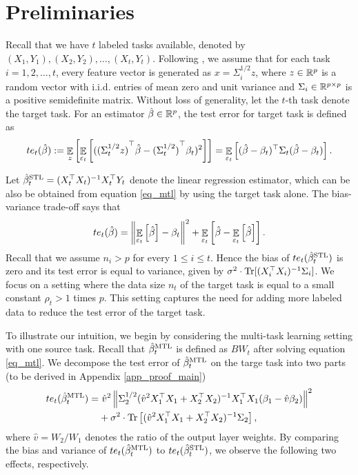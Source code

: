 \section{Preliminaries}\label{sec_setup}

Recall that we have $t$ labeled tasks available, denoted by $(X_1, Y_1), (X_2, Y_2), \dots, (X_t, Y_t)$.
Following \cite{HMRT19,BLLT20}, we assume that for each task $i = 1,2,\dots,t$,  every feature vector is generated as $x = \Sigma_i^{1/2} z$, where $z\in\mathbb{R}^p$ is a random vector with i.i.d. entries of mean zero and unit variance and $\Sigma_i\in\mathbb{R}^{p\times p}$ is a positive semidefinite matrix.
Without loss of generality, let the $t$-th task denote the target task.
For an estimator $\hat{\beta}\in\mathbb{R}^p$, the test error for target task is defined as
	\begin{align*}
		te_t(\hat{\beta}) := \mathop{\mathbb{E}}_{z}\left[ \mathop{\mathbb{E}}_{\varepsilon_t}\left[ ({(\Sigma_t^{1/2} z)}^{\top}\hat{\beta} - {(\Sigma_t^{1/2})}^{\top}\beta_t)^2 \right] \right]
		= \mathop{\mathbb{E}}_{\varepsilon_t}\left[ (\hat{\beta} - \beta_t)^{\top}\Sigma_t(\hat{\beta} - \beta_t) \right].
	\end{align*}

Let $\hat{\beta}_t^{\text{STL}} = (X_t^{\top}X_t)^{-1}X_t^{\top}Y_t$ denote the linear regression estimator, which can be also be obtained from equation \eqref{eq_mtl} by using the target task alone.
The bias-variance trade-off \cite{HTF09} says that
	\[ te_t(\hat{\beta}) =
		\left\| \mathop{\mathbb{E}}_{\varepsilon_t}\left[ \hat{\beta} \right] - \beta_t \right\|^2 + \mathop{\mathbb{E}}_{\varepsilon_t}\left[ \hat{\beta} - \mathop{\mathbb{E}}_{\varepsilon_t}\left[ \hat{\beta} \right] \right]. \]
Recall that we assume $n_i > p$ for every $1\le i\le t$.
Hence the bias of $te_t(\hat{\beta}_t^{\text{STL}})$ is zero and its test error is equal to variance, given by $\sigma^2 \cdot \operatorname{Tr}[(X_i^{\top}X_i)^{-1}\Sigma_i]$.
We focus on a setting where the data size $n_t$ of the target task is equal to a small constant $\rho_t > 1$ times $p$.
This setting captures the need for adding more labeled data to reduce the test error of the target task.

To illustrate our intuition, we begin by considering the multi-task learning setting with one source task.
Recall that $\hat{\beta}_t^{\text{MTL}}$ is defined as $BW_t$ after solving equation \eqref{eq_mtl}.
We decompose the test error of $\hat{\beta}_{t}^{\text{MTL}}$ on the targe task into two parts (to be derived in Appendix \ref{app_proof_main})
\begin{align}
	te_t(\hat{\beta}_t^{\text{MTL}}) =& ~ \hat{v}^2 \left\| \Sigma_2^{1/2} (\hat{v}^2 X_1^{\top}X_1 + X_2^{\top}X_2)^{-1}X_1^{\top}X_1 (\beta_1 - \hat{v}\beta_2) \right\|^2 \label{eq_te_model_shift} \\
	&+ \sigma^2\cdot \operatorname{Tr}\left[(\hat{v}^2 X_1^{\top}X_1 + X_2^{\top}X_2)^{-1}\Sigma_2\right], \label{eq_te_var}
\end{align}
where $\hat{v} = W_2 / W_1$ denotes the ratio of the output layer weights.
By comparing the bias and variance of $te_t(\hat{\beta}_t^{\text{MTL}})$ to $te_t(\hat{\beta}_t^{\text{STL}})$, we observe the following two effects, respectively.


